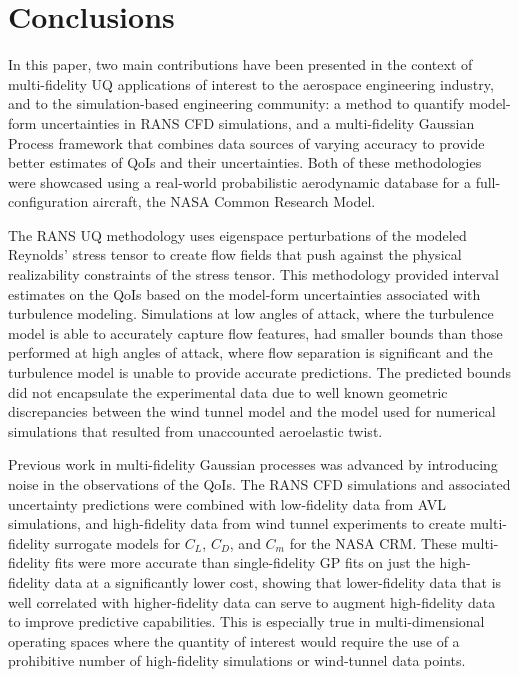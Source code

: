 \chapter{Conclusions} \label{sec:conclusions}

In this paper, two main contributions have been presented in the context of multi-fidelity UQ applications of interest to the aerospace engineering industry, and to the simulation-based engineering community: a method to quantify model-form uncertainties in RANS CFD simulations, and a multi-fidelity Gaussian Process framework that combines data sources of varying accuracy to provide better estimates of QoIs and their uncertainties. Both of these methodologies were showcased using a real-world probabilistic aerodynamic database for a full-configuration aircraft, the NASA Common Research Model. 

The RANS UQ methodology uses eigenspace perturbations of the modeled Reynolds' stress tensor to create flow fields that push against the physical realizability constraints of the stress tensor. This methodology provided interval estimates on the QoIs based on the model-form uncertainties associated with turbulence modeling. Simulations at low angles of attack, where the turbulence model is able to accurately capture flow features, had smaller bounds than those performed at high angles of attack, where flow separation is significant and the turbulence model is unable to provide accurate predictions. The predicted bounds did not encapsulate the experimental data due to well known geometric discrepancies between the wind tunnel model and the model used for numerical simulations that resulted from unaccounted aeroelastic twist.

Previous work in multi-fidelity Gaussian processes was advanced by introducing noise in the observations of the QoIs. The RANS CFD simulations and associated uncertainty predictions were combined with low-fidelity data from AVL simulations, and high-fidelity data from wind tunnel experiments to create multi-fidelity surrogate models for $C_L$, $C_D$, and $C_m$ for the NASA CRM. These multi-fidelity fits were more accurate than single-fidelity GP fits on just the high-fidelity data at a significantly lower cost, showing that lower-fidelity data that is well correlated with higher-fidelity data can serve to augment high-fidelity data to improve predictive capabilities.  This is especially true in multi-dimensional operating spaces where the quantity of interest would require the use of a prohibitive number of high-fidelity simulations or wind-tunnel data points.

